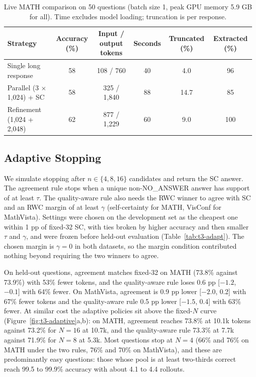 \documentclass{article}
\begin{document}
\begin{table}[t]
\centering
\caption{Live MATH comparison on 50 questions (batch size 1, peak GPU memory 5.9 GB for all). Time excludes model loading; truncation is per response.}
\label{tab:t3-live}
\footnotesize
\begin{tabular}{lccccc}
\toprule
Strategy & Accuracy (\%) & Input / output tokens & Seconds & Truncated (\%) & Extracted (\%) \\
\midrule
Single long response & 58 & 108 / 760 & 40 & 4.0 & 96 \\
Parallel (3 $\times$ 1,024) + SC & 58 & 325 / 1,840 & 88 & 14.7 & 85 \\
Refinement (1,024 + 2,048) & 62 & 877 / 1,229 & 60 & 9.0 & 100 \\
\bottomrule
\end{tabular}
\end{table}

\subsection{Adaptive Stopping}
We simulate stopping after $n\in\{4,8,16\}$ candidates \citep{aggarwal2023adaptive} and return the SC answer. The agreement rule stops when a unique non-NO\_ANSWER answer has support of at least $\tau$. The quality-aware rule also needs the RWC winner to agree with SC and an RWC margin of at least $\gamma$ (self-certainty for MATH, VisConf for MathVista). Settings were chosen on the development set as the cheapest one within 1 pp of fixed-32 SC, with ties broken by higher accuracy and then smaller $\tau$ and $\gamma$, and were frozen before held-out evaluation (Table~\ref{tab:t3-adapt}). The chosen margin is $\gamma=0$ in both datasets, so the margin condition contributed nothing beyond requiring the two winners to agree.

On held-out questions, agreement matches fixed-32 on MATH (73.8\% against 73.9\%) with 53\% fewer tokens, and the quality-aware rule loses 0.6 pp [$-1.2$, $-0.1$] with 64\% fewer. On MathVista, agreement is 0.9 pp lower [$-2.0$, 0.2] with 67\% fewer tokens and the quality-aware rule 0.5 pp lower [$-1.5$, 0.4] with 63\% fewer. At similar cost the adaptive policies sit above the fixed-$N$ curve (Figure~\ref{fig:t3-adaptive}a,b): on MATH, agreement reaches 73.8\% at 10.1k tokens against 73.2\% for $N=16$ at 10.7k, and the quality-aware rule 73.3\% at 7.7k against 71.9\% for $N=8$ at 5.3k. Most questions stop at $N=4$ (66\% and 76\% on MATH under the two rules, 76\% and 70\% on MathVista), and these are predominantly easy questions: those whose pool is at least two-thirds correct reach 99.5 to 99.9\% accuracy with about 4.1 to 4.4 rollouts.
\end{document}
